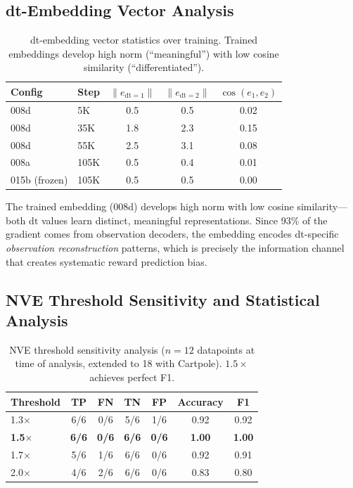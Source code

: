 \documentclass[10pt,letterpaper]{article}
\begin{document}
\subsection{dt-Embedding Vector Analysis}
\label{sec:emb_analysis}

\begin{table}[h]
\centering
\caption{dt-embedding vector statistics over training. Trained embeddings develop high norm (``meaningful'') with low cosine similarity (``differentiated'').}
\label{tab:emb_vectors}
\begin{tabular}{llccc}
\toprule
Config & Step & $\|e_{\mathrm{dt}=1}\|$ & $\|e_{\mathrm{dt}=2}\|$ & $\cos(e_1, e_2)$ \\
\midrule
008d & 5K & 0.5 & 0.5 & 0.02 \\
008d & 35K & 1.8 & 2.3 & 0.15 \\
008d & 55K & 2.5 & 3.1 & 0.08 \\
008a & 105K & 0.5 & 0.4 & 0.01 \\
015b (frozen) & 105K & 0.5 & 0.5 & 0.00 \\
\bottomrule
\end{tabular}
\end{table}

The trained embedding (008d) develops high norm with low cosine similarity---both $\mathrm{dt}$ values learn distinct, meaningful representations.
Since 93\% of the gradient comes from observation decoders, the embedding encodes dt-specific \emph{observation reconstruction} patterns, which is precisely the information channel that creates systematic reward prediction bias.

\subsection{NVE Threshold Sensitivity and Statistical Analysis}
\label{sec:threshold}

\begin{table}[h]
\centering
\caption{NVE threshold sensitivity analysis ($n=12$ datapoints at time of analysis, extended to 18 with Cartpole). $1.5\times$ achieves perfect F1.}
\label{tab:threshold}
\begin{tabular}{lcccccc}
\toprule
Threshold & TP & FN & TN & FP & Accuracy & F1 \\
\midrule
1.3$\times$ & 6/6 & 0/6 & 5/6 & 1/6 & 0.92 & 0.92 \\
\textbf{1.5$\times$} & \textbf{6/6} & \textbf{0/6} & \textbf{6/6} & \textbf{0/6} & \textbf{1.00} & \textbf{1.00} \\
1.7$\times$ & 5/6 & 1/6 & 6/6 & 0/6 & 0.92 & 0.91 \\
2.0$\times$ & 4/6 & 2/6 & 6/6 & 0/6 & 0.83 & 0.80 \\
\bottomrule
\end{tabular}
\end{table}
\end{document}

